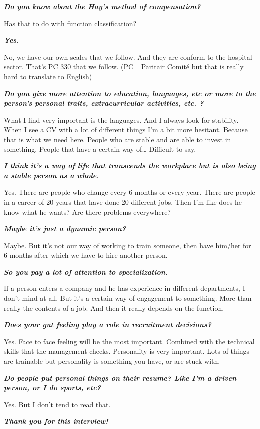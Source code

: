 \documentclass[a4paper,fleqn,11pt,dvips,titlepage]{article}
\newcommand{\question}[1]{\textbf{\textit{#1}}}
\numberwithin{figure}{section}
\numberwithin{equation}{section}
\begin{document}
\question{Do you know about the Hay’s method of compensation?}

Has that to do with function classification?

\question{Yes.}

No, we have our own scales that we follow. And they are conform to the hospital sector. That’s PC 330 that we follow. (PC= Paritair Comité but that is really hard to translate to English) 

\question{Do you give more attention to education, languages, etc or more to the person’s personal traits, extracurricular activities, etc. ?}

What I find very important is the languages. And I always look for stability. When I see a CV with a lot of different things I’m a bit more hesitant. Because that is what we need here. People who are stable and are able to invest in something. People that have a certain way of… Difficult to say. 

\question{I think it’s a way of life that transcends the workplace but is also being a stable person as a whole.}

Yes. There are people who change every 6 months or every year. There are people in a career of 20 years that have done 20 different jobs. Then I’m like does he know what he wants? Are there problems everywhere? 

\question{Maybe it’s just a dynamic person?}

Maybe. But it’s not our way of working to train someone, then have him/her for 6 months after which we have to hire another person. 

\question{So you pay a lot of attention to specialization.}

If a person enters a company and he has experience in different departments, I don’t mind at all. But it’s a certain way of engagement to something. More than really the contents of a job. And then it really depends on the function. 

\question{Does your gut feeling play a role in recruitment decisions?}

Yes. Face to face feeling will be the most important. Combined with the technical skills that the management checks. Personality is very important. Lots of things are trainable but personality is something you have, or are stuck with. 

\question{Do people put personal things on their resume? Like I’m a driven person, or I do sports, etc?}

Yes. But I don’t tend to read that. 

\question{Thank you for this interview!}
\end{document}
